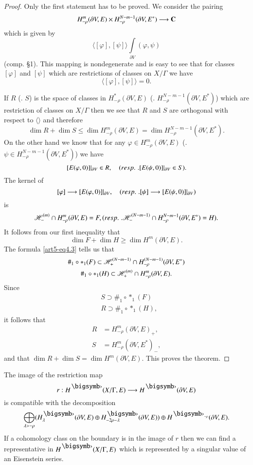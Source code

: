 \begin{proof}
Only the first statement has to be proved. We consider the pairing
$$
H^m_{-\rho} (\partial V,E) \times H^{N-m-1}_{-\rho} (\partial V, E^\ast) \longrightarrow \mathbf{C}
$$
which is given by 
$$
\langle[\varphi], [\psi] \rangle \int\limits_{\partial V}  (\varphi, \psi)
$$
(comp. \S 1). This mapping is nondegenerate and is easy to see that for classes $[\varphi]$ and $[\psi]$ which are restrictions of classes on $X/ \Gamma$ we have
$$
\langle [\varphi], [\psi] \rangle = 0.
$$

If $R$ (\resp. $S$) is the space of classes in $H^\ast_{-\rho} (\partial V, E)$ (\resp. $H^{N-m-1}_{-\rho} (\partial V, E^\ast)$) which are restriction of classes on $X/ \Gamma$ then we see that $R$ and $S$ are orthogonal with respect to $\langle \rangle$ and therefore
$$
\dim R + \dim S \leqslant \dim H^m_{-\rho} (\partial V, E) = \dim H^{N-m-1}_{-\rho} (\partial V, E^{\ast}).
$$
On the other hand we know that for any $\varphi \in H^m_{-\rho} (\partial V, E)$ (\resp. $\psi \in H^{N-m-1}_{-\rho} (\partial V, E^\ast)$) we have
$$
[E(\varphi, 0)] |_{\partial V} \in R, \quad({resp.}\kern.3em. [E(\psi, 0)] |_{\partial V } \in S).
$$
The kernel of
$$
[\varphi] \longrightarrow  [E(\varphi, 0)] |_{\partial V}, \quad ({resp.}\kern.3em. [\psi] \longrightarrow [E(\psi, 0)] |_{\partial V})
$$
is
$$
\mathscr{H}^{(m)}_- \cap H^m_{-\rho} (\partial V, E) = F, ({resp.}\kern.3em. \mathscr{H}^{(N-m -1)}_- \cap H^{N-m-1}_{-\rho} (\partial V, E^\ast) = H).
$$
It follows from our first inequality that
$$
\dim F + \dim H \geqslant \dim H^m (\partial V, E).
$$
The formula \eqref{art5-eq4.3} tells us that
\begin{gather*}
\#_1 \circ \ast_1 (F) \subset \mathscr{H}^{(N-m-1)}_+ \cap H^{(N-m-1)}_{-\rho} (\partial V, E^{\ast}) \\
\#_1 \circ \ast_1 (H) \subset \mathscr{H}^{(m)}_+ \cap H^m_{-\rho} (\partial V, E).
\end{gather*}
Since\pageoriginale
\begin{align*}
& S \supset \#_1 \circ \ast_1 (F)\\
& R \supset \#_1 \circ \ast_1 (H),
\end{align*}
it follows that
\begin{align*}
R & = H^m_{-\rho} (\partial V, E)_+,\\
S & = H^m_{-\rho} (\partial V, E^\ast)_-,
\end{align*}
and that $\dim R + \dim S = \dim H^m (\partial V, E)$. This proves the theorem.
\end{proof}

\setcounter{coro}{6}
\begin{coro}\label{art5-coro4.7}
The image of the restriction map
$$
r : H^\bigdot (X/ \Gamma, E) \longrightarrow H^\bigdot (\partial V, E)
$$
is compatible with the decomposition
$$
\bigoplus_{\lambda > -\rho} (H^\bigdot_\lambda(\partial V, E) \oplus H^{\bigdot}_{-2\rho -\lambda} (\partial V, E)) \oplus H^{\bigdot_{-\rho}} (\partial V, E).
$$
If a cohomology class on the boundary is in the image of $r$ then we can find a representative in $H^\bigdot (X/ \Gamma , E)$ which is represented by a singular value of an Eisenstein series.
\end{coro}

